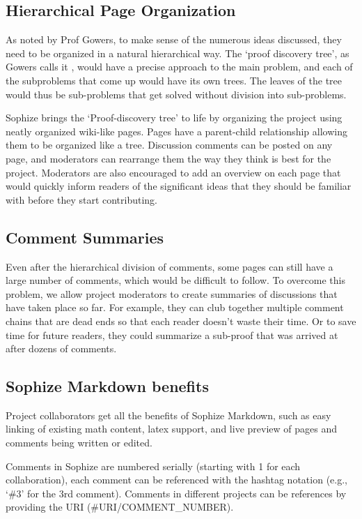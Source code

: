\documentclass[a4paper]{article}
\begin{document}
\subsection{Hierarchical Page Organization}

As noted by Prof Gowers, to make sense of the numerous ideas discussed, they need to be organized in a natural hierarchical way. The `proof discovery tree', as Gowers calls it \cite{gowers_weblog_2009}, would have a precise approach to the main problem, and each of the subproblems that come up would have its own trees. The leaves of the tree would thus be sub-problems that get solved without division into sub-problems.


Sophize brings the `Proof-discovery tree' to life by organizing the project using neatly organized wiki-like pages. Pages have a parent-child relationship allowing them to be organized like a tree. Discussion comments can be posted on any page, and moderators can rearrange them the way they think is best for the project. Moderators are also encouraged to add an overview on each page that would quickly inform readers of the significant ideas that they should be familiar with before they start contributing.


\subsection{Comment Summaries}

Even after the hierarchical division of comments, some pages can still have a large number of comments, which would be difficult to follow. To overcome this problem, we allow project moderators to create summaries of discussions that have taken place so far. For example, they can club together multiple comment chains that are dead ends so that each reader doesn't waste their time. Or to save time for future readers, they could summarize a sub-proof that was arrived at after dozens of comments.


\subsection{Sophize Markdown benefits}

Project collaborators get all the benefits of Sophize Markdown, such as easy linking of existing math content, latex support, and live preview of pages and comments being written or edited.


Comments in Sophize are numbered serially (starting with 1 for each collaboration), each comment can be referenced with the hashtag notation (e.g., `\#3' for the 3rd comment). Comments in different projects can be references by providing the URI (\#URI/COMMENT\_NUMBER).
\end{document}
